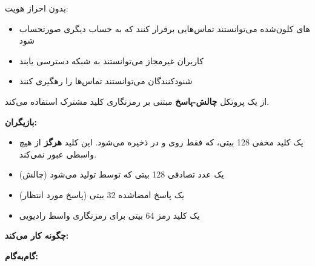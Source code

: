 

\CNchained{}

بدون احراز هویت:

\begin{itemize}
\tightlist
\item
  های کلون‌شده می‌توانستند تماس‌هایی برقرار کنند که به حساب دیگری صورتحساب شود
\item
  کاربران غیرمجاز می‌توانستند به شبکه دسترسی یابند
\item
  شنودکنندگان می‌توانستند تماس‌ها را رهگیری کنند
\end{itemize}


 از یک پروتکل \textbf{چالش-پاسخ} مبتنی بر رمزنگاری کلید مشترک استفاده می‌کند.

\textbf{بازیگران:}

\begin{itemize}
\tightlist
\item
   یک کلید مخفی 128 بیتی، که فقط روی  و در  ذخیره می‌شود. این کلید \textbf{هرگز} از هیچ واسطی عبور نمی‌کند.
\item
   یک عدد تصادفی 128 بیتی که توسط  تولید می‌شود (چالش)
\item
   یک پاسخ امضاشده 32 بیتی (پاسخ مورد انتظار)
\item
   یک کلید رمز 64 بیتی برای رمزنگاری واسط رادیویی
\end{itemize}


\textbf{چگونه کار می‌کند:}


\textbf{گام‌به‌گام:}

